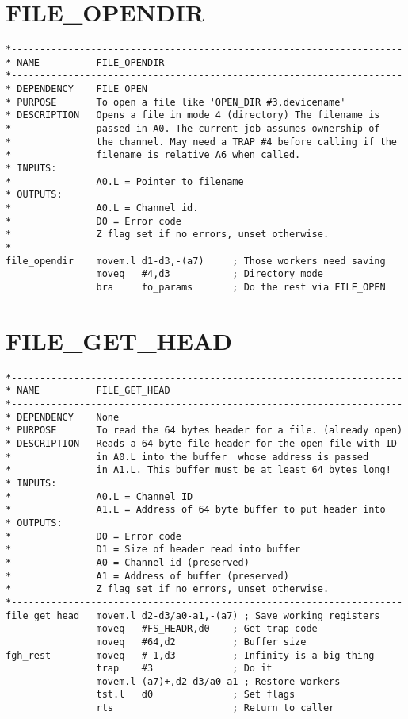 \section{FILE\_OPENDIR}
\label{ch9-FILE_OPENDIR}%

\begin{lstlisting}[firstnumber=1,caption={FILE\_OPENDIR}]
*---------------------------------------------------------------------
* NAME          FILE_OPENDIR
*---------------------------------------------------------------------
* DEPENDENCY    FILE_OPEN
* PURPOSE       To open a file like 'OPEN_DIR #3,devicename'
* DESCRIPTION   Opens a file in mode 4 (directory) The filename is
*               passed in A0. The current job assumes ownership of 
*               the channel. May need a TRAP #4 before calling if the 
*               filename is relative A6 when called.
* INPUTS:
*               A0.L = Pointer to filename
* OUTPUTS:
*               A0.L = Channel id.
*               D0 = Error code
*               Z flag set if no errors, unset otherwise.
*---------------------------------------------------------------------
file_opendir    movem.l d1-d3,-(a7)     ; Those workers need saving
                moveq   #4,d3           ; Directory mode
                bra     fo_params       ; Do the rest via FILE_OPEN
\end{lstlisting}

\section{FILE\_GET\_HEAD}
\label{ch9-FILE_GET_HEAD}%

\begin{lstlisting}[firstnumber=1,caption={FILE\_GET\_HEAD}]
*---------------------------------------------------------------------
* NAME          FILE_GET_HEAD
*---------------------------------------------------------------------
* DEPENDENCY    None
* PURPOSE       To read the 64 bytes header for a file. (already open)
* DESCRIPTION   Reads a 64 byte file header for the open file with ID
*               in A0.L into the buffer  whose address is passed
*               in A1.L. This buffer must be at least 64 bytes long!
* INPUTS:
*               A0.L = Channel ID
*               A1.L = Address of 64 byte buffer to put header into
* OUTPUTS:
*               D0 = Error code
*               D1 = Size of header read into buffer
*               A0 = Channel id (preserved)
*               A1 = Address of buffer (preserved)
*               Z flag set if no errors, unset otherwise.
*---------------------------------------------------------------------
file_get_head   movem.l d2-d3/a0-a1,-(a7) ; Save working registers
                moveq   #FS_HEADR,d0    ; Get trap code
                moveq   #64,d2          ; Buffer size
fgh_rest        moveq   #-1,d3          ; Infinity is a big thing
                trap    #3              ; Do it
                movem.l (a7)+,d2-d3/a0-a1 ; Restore workers
                tst.l   d0              ; Set flags
                rts                     ; Return to caller
\end{lstlisting}

